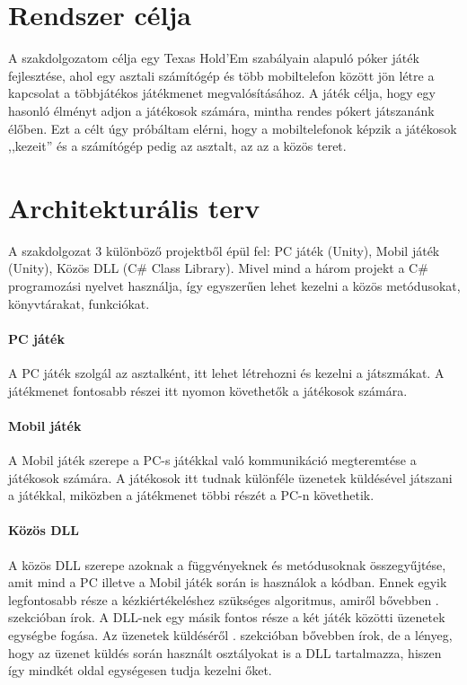 \documentclass[]{thesis-ekf}
\theoremstyle{definition}
\theoremstyle{remark}
\begin{document}
\section{Rendszer célja}

A szakdolgozatom célja egy Texas Hold'Em szabályain alapuló póker játék fejlesztése, ahol egy asztali számítógép és több mobiltelefon között jön létre a kapcsolat a többjátékos játékmenet megvalósításához. A játék célja, hogy egy hasonló élményt adjon a játékosok számára, mintha rendes pókert játszanánk élőben. Ezt a célt úgy próbáltam elérni, hogy a mobiltelefonok képzik a játékosok ,,kezeit'' és a számítógép pedig az asztalt, az az a közös teret.

\section{Architekturális terv}
\label{sec-architecture}

A szakdolgozat 3 különböző projektből épül fel: PC játék (Unity), Mobil játék (Unity), Közös DLL (C\# Class Library). Mivel mind a három projekt a C\# programozási nyelvet használja, így egyszerűen lehet kezelni a közös metódusokat, könyvtárakat, funkciókat.

\paragraph{PC játék}

A PC játék szolgál az asztalként, itt lehet létrehozni és kezelni a játszmákat. A játékmenet fontosabb részei itt nyomon követhetők a játékosok számára. 

\paragraph{Mobil játék}

A Mobil játék szerepe a PC-s játékkal való kommunikáció megteremtése a játékosok számára. A játékosok itt tudnak különféle üzenetek küldésével játszani a játékkal, miközben a játékmenet többi részét a PC-n követhetik.

\paragraph{Közös DLL}

A közös DLL szerepe azoknak a függvényeknek és metódusoknak összegyűjtése, amit mind a PC illetve a Mobil játék során is használok a kódban. Ennek egyik legfontosabb része a kézkiértékeléshez szükséges algoritmus, amiről bővebben . szekcióban írok. A DLL-nek egy másik fontos része a két játék közötti üzenetek egységbe fogása. Az üzenetek küldéséről . szekcióban bővebben írok, de a lényeg, hogy az üzenet küldés során használt osztályokat is a DLL tartalmazza, hiszen így mindkét oldal egységesen tudja kezelni őket.
\end{document}
